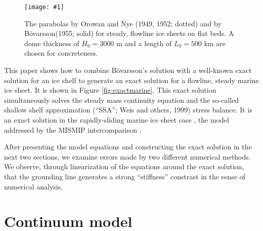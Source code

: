 \documentclass[twocolumn]{igs}
\renewcommand{\dh}{\fontencoding{T1}\selectfont{\symbol{240}}}
\newcommand{\onecol}[1]{\texttt{[image: \#1]}}
\newcommand{\bod}{B\"o\dh varsson\xspace}
\begin{document}
\begin{figure}[ht]
\onecol{twoparabolas}
\caption{The parabolas by Orowan and Nye (1949, 1952; dotted) and by \bod (1955; solid) for steady, flowline ice sheets on flat beds.  A dome thickness of $H_0=3000$ m and a length of $L_0=500$ km are chosen for concreteness.} \label{fig:twoparabolas}
\end{figure}

This paper shows how to combine \bod's solution with a well-known exact solution for an ice shelf \citep{vanderVeen83,vanderVeen} to generate an exact solution for a flowline, steady marine ice sheet.  It is shown in Figure \ref{fig:exactmarine}.  This exact solution simultaneously solves the steady mass continuity equation and the so-called shallow shelf approximation (``SSA''; Weis and others, 1999)\nocite{WeisGreveHutter} stress balance.  It is an exact solution in the rapidly-sliding marine ice sheet case \citep{SchoofMarine1}, the model addressed by the MISMIP intercomparison \citep{MISMIP2012}.

After presenting the model equations and constructing the exact solution in the next two sections, we examine errors made by two different numerical methods.  We observe, through linearization of the equations around the exact solution, that the grounding line generates a strong ``stiffness'' constrast in the sense of numerical analysis.


\section{Continuum model}
\end{document}
